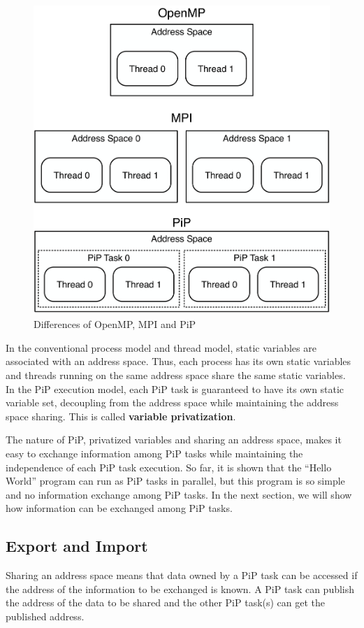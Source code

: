 \begin{figure}[ht]
\centering
\includegraphics[width=0.7\columnwidth]{tasks/Figs/AddressSpace-OpenMP-MPI-PiP.pdf}
\caption{Differences of OpenMP, MPI and PiP}
\label{fig:tasks:hello-var-omp}
\end{figure}

In the conventional process model and thread model, static variables
are associated with an address space. Thus, each process has its own
static variables and threads running on the same address space share
the same static variables. In the PiP execution model, each PiP task
is guaranteed to have its own static variable set, decoupling from the
address space while maintaining the address space sharing. This is
called {\bf variable privatization}. 

The nature of PiP, privatized variables and sharing an address space,
makes it easy to exchange information among PiP tasks while
maintaining the independence of each PiP task execution. 
So far, it is shown that the ``Hello World'' program can run as PiP
tasks in parallel, but this program is so simple and no information
exchange among PiP tasks. In the next section, we will show how
information can be exchanged among PiP tasks.

\subsection{Export and Import}

Sharing an address space means that data owned by a PiP task
can be accessed if the address of the information to be exchanged is
known. A PiP task can publish the address of the data to be shared
and the other PiP task(s) can get the published address. 

